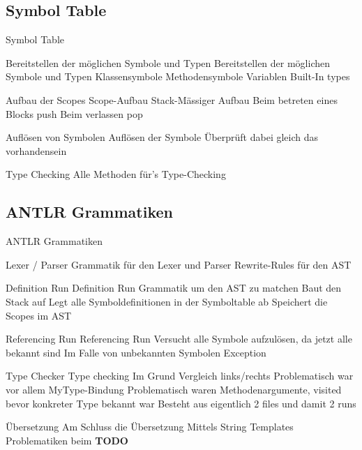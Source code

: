\subsection{Symbol Table}
\begin{frame}[t]{Symbol Table}
	\begin{bigitemize}[<+->]{3mm}
		\item Bereitstellen der möglichen Symbole und Typen
		 {Bereitstellen der möglichen Symbole und Typen}
		 {Klassensymbole}
		 {Methodensymbole}
		 {Variablen}
		 {Built-In types}

		\item Aufbau der Scopes 
		 {Scope-Aufbau}
		 {Stack-Mässiger Aufbau}
		 {Beim betreten eines Blocks push}
		 {Beim verlassen pop}

		\item Auflösen von Symbolen
		 {Auflösen der Symbole}
		 {Überprüft dabei gleich das vorhandensein}

		\item Type Checking
		 {Alle Methoden für's Type-Checking}
	\end{bigitemize}
\end{frame}

\subsection{ANTLR Grammatiken}
\begin{frame}[t]{ANTLR Grammatiken}
	\begin{bigitemize}[<+->]{3mm}
		\item Lexer / Parser
		 {Grammatik für den Lexer und Parser}
		 {Rewrite-Rules für den AST}

		\item Definition Run
		 {Definition Run}
		 {Grammatik um den AST zu matchen}
		 {Baut den Stack auf}
		 {Legt alle Symboldefinitionen in der Symboltable ab}
		 {Speichert die Scopes im AST}

		\item Referencing Run
		 {Referencing Run}
		 {Versucht alle Symbole aufzulösen, da jetzt alle bekannt sind}
		 {Im Falle von unbekannten Symbolen Exception}

		\item Type Checker
		 {Type checking}
		 {Im Grund Vergleich links/rechts}
		 {Problematisch war vor allem MyType-Bindung}
		 {Problematisch waren Methodenargumente, visited bevor konkreter Type bekannt war}
		 {Besteht aus eigentlich 2 files und damit 2 runs}

		\item Übersetzung
		 {Am Schluss die Übersetzung}
		 {Mittels String Templates}
		 {Problematiken beim }
		 {\textbf{TODO}}
	\end{bigitemize}
\end{frame}

